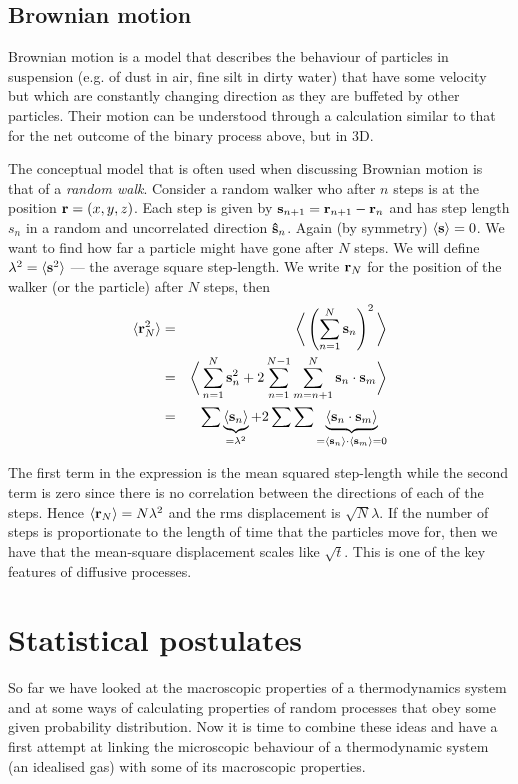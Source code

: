 \documentclass{article}
\begin{document}
\subsection*{Brownian motion}
Brownian motion is a model that describes the behaviour of particles in suspension (e.g. of dust in air, fine silt in dirty water) that have some velocity but which are constantly changing direction as they are buffeted by other particles. Their motion can be understood through a calculation similar to that for the net outcome of the binary process above, but in 3D.

The conceptual model that is often used when discussing Brownian motion is that of a \emph{random walk}. Consider a random walker who after $n$ steps is at the position ${\bf r} = (x,y,z)$. Each step is given by ${\bf s}_{n+1} = {\bf r}_{n+1}- {\bf r}_n$ and has step length $s_n$ in a random and uncorrelated direction ${\bf\hat{s}}_n$. Again (by symmetry) $\langle {\bf s}\rangle =0$. We want to find how far a particle might have gone after $N$ steps. We will define $\lambda^2= \langle {\bf s}^2\rangle$ --- the average square step-length. We write ${\bf r}_N$ for the position of the walker (or the particle) after $N$ steps, then
\begin{eqnarray*}
	\langle {\bf r}_N^2 \rangle &=& \bigg\langle \left(\sum_{n=1}^N{\bf s}_n\right)^2 \bigg\rangle\\
		&=& \bigg\langle \sum_{n=1}^N{\bf s}_n^2 +2\sum_{n=1}^{N-1}\sum_{m=n+1}^N{\bf s}_n\cdot{\bf s}_m \bigg\rangle\\
		&=& \sum\underbrace{\langle {\bf s}_n\rangle}_{=\lambda^2} + 2\sum\sum \underbrace{\langle {\bf s}_n \cdot {\bf s}_m \rangle}_{=\langle {\bf s}_n\rangle \cdot \langle{\bf s}_m \rangle=0}
\end{eqnarray*}

The first term in the expression is the mean squared step-length while the second term is zero since there is no correlation between the directions of each of the steps. Hence $\langle {\bf r}_N\rangle = N\lambda^2$ and the rms displacement is $\sqrt{N}\lambda$. If the number of steps is proportionate to the length of time that the particles move for, then we have that the mean-square displacement scales like $\sqrt{t}$. This is one of the key features of diffusive processes. 

\section*{Statistical postulates}
So far we have looked at the macroscopic properties of a thermodynamics system and at some ways of calculating properties of random processes that obey some given probability distribution. Now it is time to combine these ideas and have a first attempt at linking the microscopic behaviour of a thermodynamic system (an idealised gas) with some of its macroscopic properties.
\end{document}
